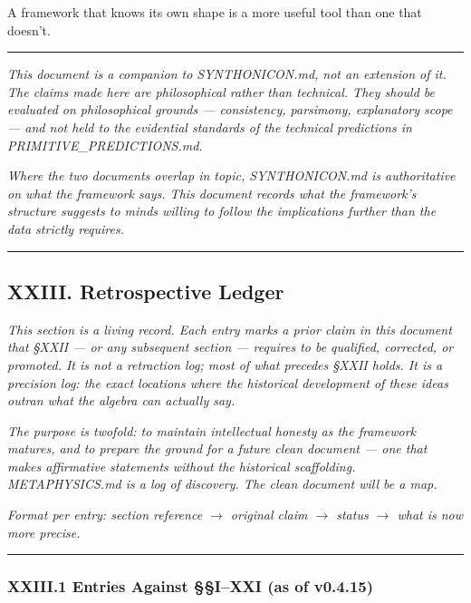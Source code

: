 \documentclass[12pt,a4paper]{article}
\begin{document}
A framework that knows its own shape is a more useful tool than one that doesn't.

\begin{center}
\rule{0.5\textwidth}{0.4pt}
\end{center}

\emph{This document is a companion to SYNTHONICON.md, not an extension of it. The claims made here are philosophical rather than technical. They should be evaluated on philosophical grounds --- consistency, parsimony, explanatory scope --- and not held to the evidential standards of the technical predictions in PRIMITIVE\_PREDICTIONS.md.}

\emph{Where the two documents overlap in topic, SYNTHONICON.md is authoritative on what the framework says. This document records what the framework's structure suggests to minds willing to follow the implications further than the data strictly requires.}

\begin{center}
\rule{0.5\textwidth}{0.4pt}
\end{center}

\subsection{XXIII. Retrospective Ledger}

\emph{This section is a living record. Each entry marks a prior claim in this document that §XXII --- or any subsequent section --- requires to be qualified, corrected, or promoted. It is not a retraction log; most of what precedes §XXII holds. It is a precision log: the exact locations where the historical development of these ideas outran what the algebra can actually say.}

\emph{The purpose is twofold: to maintain intellectual honesty as the framework matures, and to prepare the ground for a future clean document --- one that makes affirmative statements without the historical scaffolding. METAPHYSICS.md is a log of discovery. The clean document will be a map.}

\emph{Format per entry: section reference $\rightarrow$ original claim $\rightarrow$ status $\rightarrow$ what is now more precise.}

\begin{center}
\rule{0.5\textwidth}{0.4pt}
\end{center}

\subsubsection{XXIII.1 Entries Against §§I--XXI (as of v0.4.15)}
\end{document}
